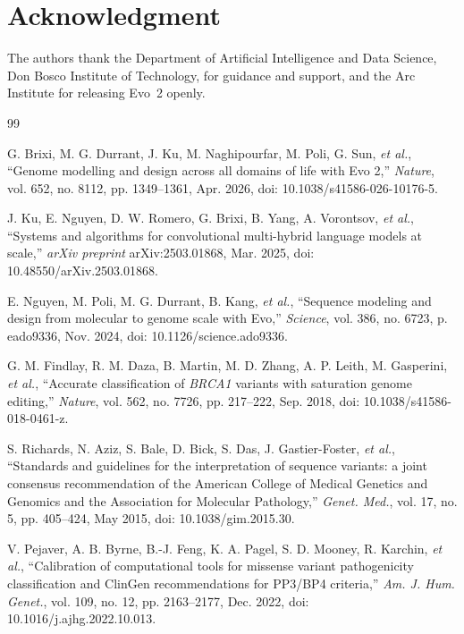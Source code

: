 \documentclass[10pt,journal,a4paper]{IEEEtran}
\begin{document}
\section*{Acknowledgment}
The authors thank the Department of Artificial Intelligence and Data Science, Don Bosco Institute of Technology, for guidance and support, and the Arc Institute for releasing Evo~2 openly.

\begin{thebibliography}{99}

 G. Brixi, M. G. Durrant, J. Ku, M. Naghipourfar, M. Poli, G. Sun, \emph{et al.}, ``Genome modelling and design across all domains of life with Evo 2,'' \textit{Nature}, vol. 652, no. 8112, pp. 1349--1361, Apr. 2026, doi: 10.1038/s41586-026-10176-5.

 J. Ku, E. Nguyen, D. W. Romero, G. Brixi, B. Yang, A. Vorontsov, \emph{et al.}, ``Systems and algorithms for convolutional multi-hybrid language models at scale,'' \textit{arXiv preprint} arXiv:2503.01868, Mar. 2025, doi: 10.48550/arXiv.2503.01868.

 E. Nguyen, M. Poli, M. G. Durrant, B. Kang, \emph{et al.}, ``Sequence modeling and design from molecular to genome scale with Evo,'' \textit{Science}, vol. 386, no. 6723, p. eado9336, Nov. 2024, doi: 10.1126/science.ado9336.

 G. M. Findlay, R. M. Daza, B. Martin, M. D. Zhang, A. P. Leith, M. Gasperini, \emph{et al.}, ``Accurate classification of \emph{BRCA1} variants with saturation genome editing,'' \textit{Nature}, vol. 562, no. 7726, pp. 217--222, Sep. 2018, doi: 10.1038/s41586-018-0461-z.

 S. Richards, N. Aziz, S. Bale, D. Bick, S. Das, J. Gastier-Foster, \emph{et al.}, ``Standards and guidelines for the interpretation of sequence variants: a joint consensus recommendation of the American College of Medical Genetics and Genomics and the Association for Molecular Pathology,'' \textit{Genet. Med.}, vol. 17, no. 5, pp. 405--424, May 2015, doi: 10.1038/gim.2015.30.

 V. Pejaver, A. B. Byrne, B.-J. Feng, K. A. Pagel, S. D. Mooney, R. Karchin, \emph{et al.}, ``Calibration of computational tools for missense variant pathogenicity classification and ClinGen recommendations for PP3/BP4 criteria,'' \textit{Am. J. Hum. Genet.}, vol. 109, no. 12, pp. 2163--2177, Dec. 2022, doi: 10.1016/j.ajhg.2022.10.013.


\end{thebibliography}
\end{document}
